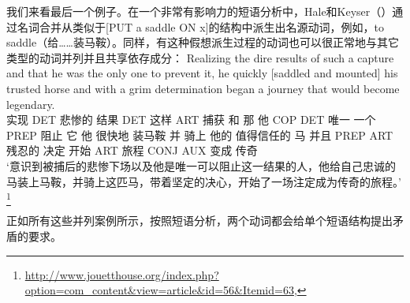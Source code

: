     我们来看最后一个例子。在一个非常有影响力的短语分析中，Hale和Keyser（\citeyear{HK93a-u}）通过名词合并从类似于[PUT a saddle ON x]的结构中派生出名源动词，例如，to saddle（给……装马鞍）。同样，有这种假想派生过程的动词也可以很正常地与其它类型的动词并列并且共享依存成分：
\ea
\gll Realizing the dire results of such a capture and that he was the only one to prevent it, he quickly [saddled and mounted] his trusted horse and with a grim determination began a journey that would become legendary.\\
    实现 DET 悲惨的 结果 DET 这样 ART 捕获 和 那 他 COP DET 唯一 一个 PREP 阻止 它 他 很快地 装马鞍 并 骑上 他的 值得信任的 马 并且 PREP ART 残忍的 决定 开始 ART 旅程 CONJ AUX 变成 传奇\\
\glt `意识到被捕后的悲惨下场以及他是唯一可以阻止这一结果的人，他给自己忠诚的马装上马鞍，并骑上这匹马，带着坚定的决心，开始了一场注定成为传奇的旅程。' 
\footnote{\url{http://www.jouetthouse.org/index.php?option=com_content&view=article&id=56&Itemid=63},
  }  
\z

\noindent
正如所有这些\xnullc 并列案例所示，按照短语分析，两个动词都会给单个短语结构提出矛盾的要求。


